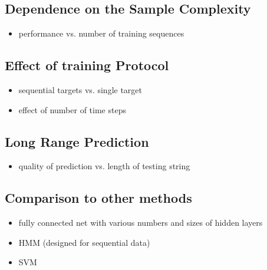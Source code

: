 \documentclass[fleqn,11pt]{article}
\begin{document}
{%
\subsection{Dependence on the Sample Complexity}
\begin{itemize}
\item performance vs. number of training sequences
\end{itemize}

\subsection{Effect of training Protocol}
\begin{itemize}
\item sequential targets vs. single target
\item effect of number of time steps
\end{itemize}

\subsection{Long Range Prediction}
\begin{itemize}
\item quality of prediction vs. length of testing string
\end{itemize}

\subsection{Comparison to other methods}
\begin{itemize}
\item fully connected net with various numbers and sizes of hidden layers
\item HMM (designed for sequential data)
\item SVM
\end{itemize}

}
\end{document}
